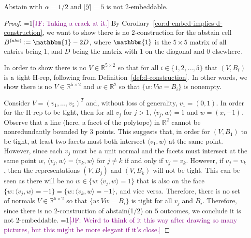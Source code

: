 \documentclass[anon,12pt]{colt2019}
\newcommand{\Comments}{1}
\newcommand{\mynote}[2]{\ifnum\Comments=1\textcolor{#1}{#2}\fi}
\newcommand{\jessie}[1]{\mynote{purple}{[JF: #1]}}
\newcommand{\reals}{\mathbb{R}}
\newcommand{\Y}{\mathcal{Y}}
\newcommand{\ones}{\mathbbm{1}}
\begin{document}
\begin{theorem}
  Abstain with $\alpha=1/2$ and $|\Y|=5$ is not $2$-embeddable.
\end{theorem}
\begin{proof}
\jessie{Taking a crack at it.}
By Corollary~\ref{cor:d-embed-implies-d-construction}, we want to show there is no $2$-construction for the abstain cell $B^{(abs)} := \ones - 2D$, where $\ones$ is the $5\times 5$ matrix of all entries being $1$, and $D$ being the matrix with $1$ on the diagonal and $0$ elsewhere.

In order to show there is no $V\in \reals^{5\times 2}$ so that for all $i \in \{1, 2, \ldots, 5\}$ that $(V, B_i)$ is a tight H-rep, following from Definition~\ref{def:d-construction}.
In other words, we show there is no $V \in \reals^{5\times 2}$ and $w \in \reals^2$ so that $\{w : Vw = B_i\}$ is nonempty.

Consider $V = (v_1, \ldots, v_5)^T$ and, without loss of generality, $v_1 = (0,1)$.
In order for the H-rep to be tight, then for all $v_j$ for $j > 1$, $\langle v_j, w \rangle = 1$ and $w = (x, -1)$.
Observe that a line (here, a facet of the polytope) in $\reals^2$ cannot be nonredundantly bounded by $3$ points.
This suggests that, in order for $(V,B_1)$ to be tight, at least two facets must both intersect $\langle v_1, w \rangle$ at the same point.
However, since each $v_j$ must be a unit normal and the facets must intersect at the same point $w$, $\langle v_j, w \rangle = \langle v_k, w \rangle$ for $j \neq k$ if and only if $v_j = v_k$.
However, if $v_j = v_k$, then the representations $(V, B_j)$ and $(V, B_k)$ will not be tight. 
This can be seen as there will be no $w \in \{ w: \langle v_j, w \rangle = 1 \}$ that is also on the face $\{w : \langle v_j, w \rangle =-1 \} = \{w : \langle v_k, w \rangle = -1\}$, and vice versa.
Therefore, there is no set of normals $V \in \reals^{5\times 2}$ so that $\{w : Vw = B_i\}$ is tight for all $v_j$ and $B_i$.
Therefore, since there is no $2$-construction of abstain(1/2) on $5$ outcomes, we conclude it is not $2$-embeddable.
\jessie{Weird to think of it this way after drawing so many pictures, but this might be more elegant if it's close.}
\end{proof}
\end{document}
